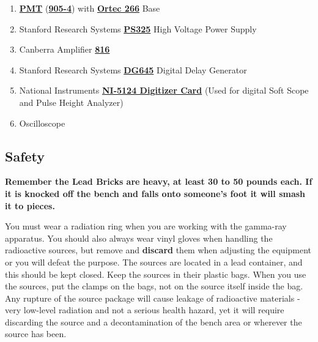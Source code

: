 \documentclass{../lab}
\begin{document}
\begin{enumerate}
    \item \href{http://physics111.lib.berkeley.edu/Physics111/Reprints/GMA/905-series-nai-radiation-detectors.pdf}{\textbf{PMT}} (\href{http://experimentationlab.berkeley.edu/sites/default/files/images/905-4.pdf}{\textbf{905-4}}) with \href{http://physics111.lib.berkeley.edu/Physics111/Reprints/GMA/266-Photomultiplier-Base.pdf}{\textbf{Ortec 266}} Base
    
    \item Stanford Research Systems  \href{http://physics111.lib.berkeley.edu/Physics111/Equipment_Manuals/GMA/PS325m.pdf}{\textbf{PS325}} High Voltage Power Supply

    \item Canberra Amplifier  \href{http://physics111.lib.berkeley.edu/Physics111/Reprints/GMA/GMA\%20OCR\%20Canberra\%20spectroscopy\%20amp\%20816.pdf}{\textbf{816}}

    \item Stanford Research Systems  \href{http://physics111.lib.berkeley.edu/Physics111/Equipment_Manuals/GMA/DG645m.pdf}{\textbf{DG645}} Digital Delay Generator

    \item National Instruments \href{http://physics111.lib.berkeley.edu/Physics111/Reprints/GMA/NI_PCI-5124.pdf}{\textbf{NI-5124 Digitizer Card}} (Used for digital Soft Scope and Pulse Height Analyzer)

    \item Oscilloscope

\end{enumerate}

\subsection{Safety}

\textbf{Remember the Lead Bricks are heavy, at least 30 to 50 pounds each. If it is knocked off the bench and falls onto someone's foot it will smash it to pieces.}

You must wear a radiation ring when you are working with the gamma-ray apparatus. You should also always wear vinyl gloves when handling the radioactive sources, but remove and \textbf{discard} them when adjusting the equipment or you will defeat the purpose. The sources are located in a lead container, and this should be kept closed. Keep the sources in their plastic bags. When you use the sources, put the clamps on the bags, not on the source itself inside the bag. Any rupture of the source package will cause leakage of radioactive materials - very low-level radiation and not a serious health hazard, yet it will require discarding the source and a decontamination of the bench area or wherever the source has been.
\end{document}
